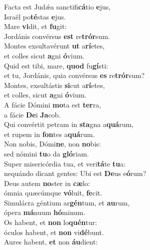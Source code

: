 \evenverse Facta est Judǽa sanctifi\textbf{cá}tio \textbf{e}jus,~\*\\
\evenverse Israël po\textbf{té}stas \textbf{e}jus.\\
\oddverse Mare \textbf{vi}dit, et \textbf{fu}git:~\*\\
\oddverse Jordánis convérsus \textbf{est} re\textbf{trór}sum.\\
\evenverse Montes exsultavérunt \textbf{ut} a\textbf{rí}etes,~\*\\
\evenverse et colles sicut \textbf{a}gni \textbf{ó}vium.\\
\oddverse Quid est tibi, mare, \textbf{quod} fu\textbf{gí}sti:~\*\\
\oddverse et tu, Jordánis, quia convérsus \textbf{es} re\textbf{trór}sum?\\
\evenverse Montes, exsultástis \textbf{si}cut a\textbf{rí}etes,~\*\\
\evenverse et colles, sicut \textbf{a}gni \textbf{ó}vium.\\
\oddverse A fácie Dómini \textbf{mo}ta est \textbf{ter}ra,~\*\\
\oddverse a fácie \textbf{De}i \textbf{Ja}cob.\\
\evenverse Qui convértit petram in \textbf{sta}gna a\textbf{quá}rum,~\*\\
\evenverse et rupem in \textbf{fon}tes a\textbf{quá}rum.\\
\oddverse Non nobis, Dómi\textbf{ne}, non \textbf{no}bis:~\*\\
\oddverse sed nómini \textbf{tu}o da \textbf{gló}riam.\\
\evenverse Super misericórdia tua, et veri\textbf{tá}te \textbf{tu}a:~\*\\
\evenverse nequándo dicant gentes: Ubi est \textbf{De}us e\textbf{ó}rum?\\
\oddverse Deus autem \textbf{no}ster in \textbf{cæ}lo:~\*\\
\oddverse ómnia quæcúmque \textbf{vó}luit, \textbf{fe}cit.\\
\evenverse Simulácra géntium ar\textbf{gén}tum, et \textbf{au}rum,~\*\\
\evenverse ópera \textbf{má}nuum \textbf{hó}minum.\\
\oddverse Os habent, et \textbf{non} lo\textbf{quén}tur:~\*\\
\oddverse óculos habent, et \textbf{non} vi\textbf{dé}bunt.\\
\evenverse Aures habent, \textbf{et} non \textbf{áu}dient:~\*\\
